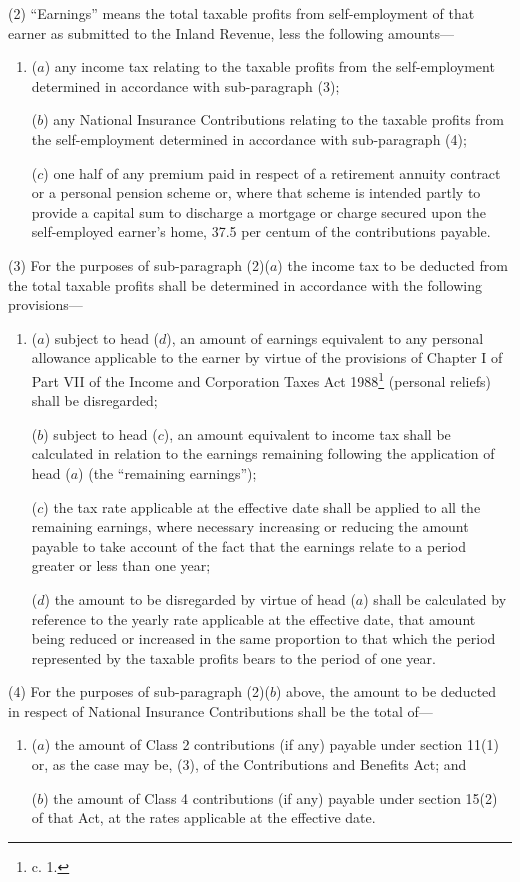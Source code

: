\documentclass[12pt,a4paper]{article}
\begin{document}
(2) “Earnings” means the total taxable profits from self-employment of that earner as submitted to the Inland Revenue, less the following amounts—
\begin{enumerate}\item[]
($a$) any income tax relating to the taxable profits from the self-employment determined in accordance with sub-paragraph (3);

($b$) any National Insurance Contributions relating to the taxable profits from the self-employment determined in accordance with sub-paragraph (4);

($c$) one half of any premium paid in respect of a retirement annuity contract or a personal pension scheme or, where that scheme is intended partly to provide a capital sum to discharge a mortgage or charge secured upon the self-employed earner’s home, 37.5 per centum of the contributions payable.
\end{enumerate}

(3) For the purposes of sub-paragraph (2)($a$) the income tax to be deducted from the total taxable profits shall be determined in accordance with the following provisions—
\begin{enumerate}\item[]
($a$) subject to head ($d$), an amount of earnings equivalent to any personal allowance applicable to the earner by virtue of the provisions of Chapter I of Part VII of the Income and Corporation Taxes Act 1988\footnote{ c. 1.} (personal reliefs) shall be disregarded;

($b$) subject to head ($c$), an amount equivalent to income tax shall be calculated in relation to the earnings remaining following the application of head ($a$) (the “remaining earnings”);

($c$) the tax rate applicable at the effective date shall be applied to all the remaining earnings, where necessary increasing or reducing the amount payable to take account of the fact that the earnings relate to a period greater or less than one year;

($d$) the amount to be disregarded by virtue of head ($a$) shall be calculated by reference to the yearly rate applicable at the effective date, that amount being reduced or increased in the same proportion to that which the period represented by the taxable profits bears to the period of one year.
\end{enumerate}

(4) For the purposes of sub-paragraph (2)($b$) above, the amount to be deducted in respect of National Insurance Contributions shall be the total of—
\begin{enumerate}\item[]
($a$) the amount of Class 2 contributions (if any) payable under section 11(1) or, as the case may be, (3), of the Contributions and Benefits Act; and

($b$) the amount of Class 4 contributions (if any) payable under section 15(2) of that Act,
at the rates applicable at the effective date.
\end{enumerate}
\end{document}
